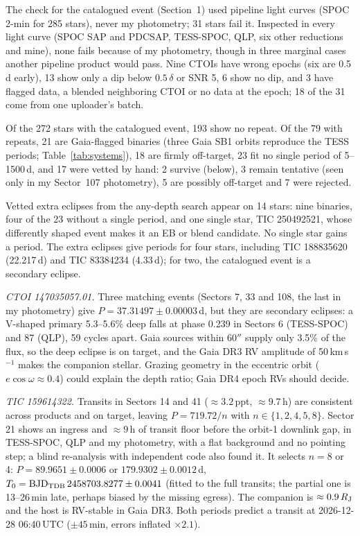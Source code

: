 \documentclass{aastex701}
\begin{document}
The check for the catalogued event (Section~1) used pipeline light curves (SPOC 2-min for 285
stars), never my photometry; 31 stars fail it. Inspected in every light curve (SPOC SAP and PDCSAP, TESS-SPOC, QLP, six other reductions
and mine), none fails because of my photometry, though in three marginal cases another pipeline
product would pass. Nine CTOIs have wrong epochs (six are 0.5\,d early), 13 show only a dip below
$0.5\,\delta$ or SNR 5, 6 show no dip, and 3 have flagged data, a blended neighboring CTOI or no data
at the epoch; 18 of the 31 come from one uploader's batch.

Of the 272 stars with the catalogued event, 193 show no repeat. Of the 79 with repeats, 21 are
Gaia-flagged binaries (three Gaia SB1 orbits reproduce the TESS periods; Table~\ref{tab:systems}),
18 are firmly off-target, 23 fit no single period of 5--1500\,d, and 17 were vetted by hand: 2
survive (below), 3 remain tentative (seen only in my Sector~107 photometry), 5 are possibly
off-target and 7 were rejected.

Vetted extra eclipses from the any-depth search appear on 14 stars: nine binaries, four of the 23
without a single period, and one single star, TIC 250492521, whose differently shaped event makes it
an EB or blend candidate. No single star gains a period. The extra eclipses give periods for four
stars, including TIC 188835620 (22.217\,d) and TIC 83384234 (4.33\,d); for two, the catalogued event
is a secondary eclipse.

\textit{CTOI 147035057.01.} Three matching events (Sectors 7, 33 and 108, the last in my
photometry) give $P=37.31497\pm0.00003$\,d, but they are secondary eclipses: a V-shaped primary
5.3--5.6\% deep falls at phase 0.239 in Sectors 6 (TESS-SPOC) and 87 (QLP), 59 cycles apart. Gaia
sources within $60''$ supply only 3.5\% of the flux, so the deep eclipse is on target, and the Gaia DR3 RV
amplitude of 50\,km\,s$^{-1}$ makes the companion stellar. Grazing geometry in the eccentric orbit
($e\cos\omega\approx0.4$) could explain the depth ratio; Gaia DR4 epoch RVs should decide.

\textit{TIC 159614322.} Transits in Sectors 14 and 41 ($\approx3.2$\,ppt, $\approx9.7$\,h) are
consistent across products and on target, leaving $P=719.72/n$ with $n\in\{1,2,4,5,8\}$. Sector 21
shows an ingress and $\approx9$\,h of transit floor before the orbit-1 downlink gap, in TESS-SPOC,
QLP and my photometry, with a flat background and no pointing step; a blind re-analysis with
independent code also found it. It selects $n=8$ or 4: $P=89.9651\pm0.0006$ or
$179.9302\pm0.0012$\,d, $T_0={\rm BJD_{TDB}}\,2458703.8277\pm0.0041$ (fitted to the full transits;
the partial one is 13--26\,min late, perhaps biased by the missing egress). The companion is
$\approx0.9\,R_{\rm J}$ and the host is RV-stable in Gaia DR3. Both periods predict a transit at
2026-12-28 06:40\,UTC ($\pm45$\,min, errors inflated $\times2.1$).
\end{document}
